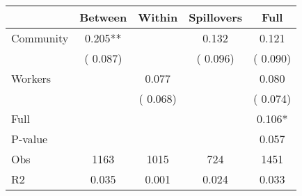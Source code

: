 
\begin{tabular}{l*{4}{c}}\hline&\multicolumn{1}{c}{Between}&\multicolumn{1}{c}{Within}&\multicolumn{1}{c}{Spillovers}&\multicolumn{1}{c}{Full}\\ \hline
 Community             &              0.205**      &                                               &        0.132 &         0.121                            \\ 
                               &        (       0.087)           &                                       &       (       0.096)     &      (       0.090)                                           \\ 
 Workers       &                                               &        0.077    &                                &             0.080                            \\ 
                               &                                               & (       0.068)                  &                                        &      (       0.074)                                           \\ 
\hline                                                                                                                                                                                                                                            
 Full                  &                                               &                                               &                                        &             0.106*                                     \\ 
 P-value               &                                               &                                               &                                        &             0.057                                           \\ 
 Obs                   &               1163               &       1015                       &       724                &              1451                                               \\ 
 R2                    &                      0.035              &              0.001                      &              0.024               &                     0.033                                              \\ 
\hline \end{tabular}                                                                                                                                                                                                              